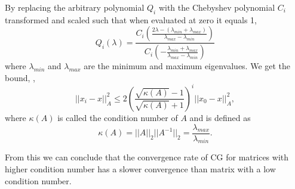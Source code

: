 By replacing the arbitrary polynomial \(Q_i\) with the Chebyshev polynomial \(C_i\) transformed and scaled such that when evaluated at zero it equals 1, 
\begin{equation*}
    Q_i(\lambda)=\frac{C_i \left(\frac{2\lambda-(\lambda_{min}+\lambda_{max})}{\lambda_{max}-\lambda_{min}}\right)}{C_i \left(- \frac{\lambda_{min}+\lambda_{max}}{\lambda_{max}-\lambda_{min}}\right)}
\end{equation*}
where \(\lambda_{min}\) and \(\lambda_{max}\) are the minimum and maximum eigenvalues. We get the bound, \cite{Vorst03},
\begin{equation}
    ||x_i-x||_A^2\leq 2 \left(\frac{\sqrt{\kappa(A)}-1}{\sqrt{\kappa(A)}+1}\right)^i||x_0-x||_A^2,
\end{equation}
where \(\kappa(A)\) is called the condition number of \(A\) and is defined as
\begin{equation*}
    \kappa(A)=||A||_2||A^{-1}||_2=\frac{\lambda_{max}}{\lambda_{min}}.
\end{equation*}

From this we can conclude that the convergence rate of CG for matrices with higher condition number has a slower convergence than matrix with a low condition number.
